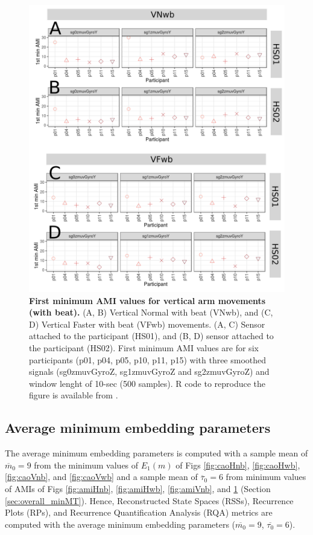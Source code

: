 \begin{figure}[!h]
\centering
\includegraphics[width=1.0\textwidth]{ami_Vwb_w10}
	\caption{
	{\bf First minimum AMI values for vertical arm movements (with beat).}
		(A, B) Vertical Normal with beat (VNwb), and 
		(C, D) Vertical Faster with beat (VFwb) movements.
		(A, C) Sensor attached to the participant (HS01), and
		(B, D) sensor attached to the participant (HS02).
		First minimum AMI values are for six participants 
		(p01, p04, p05, p10, p11, p15) with three smoothed 
		signals (sg0zmuvGyroZ, sg1zmuvGyroZ and sg2zmuvGyroZ) and 
		window lenght of 10-sec (500 samples).
		R code to reproduce the figure is available 
		from \cite{hwum2018}.
        }
    \label{fig:amiVwb}
\end{figure}



\subsection{Average minimum embedding parameters}
The average minimum embedding parameters is computed with 
a sample mean of $\overline{m}_0=9$ from the minimum values 
of $E_{1}(m)$ of Figs \ref{fig:caoHnb}, \ref{fig:caoHwb}, 
\ref{fig:caoVnb}, and \ref{fig:caoVwb} 
and a sample mean of $\overline{\tau}_0=6$ from minimum values of AMIs 
of Figs \ref{fig:amiHnb}, \ref{fig:amiHwb}, 
\ref{fig:amiVnb}, and \ref{fig:amiVwb} (Section \ref{sec:overall_minMT}).
Hence, Reconstructed State Spaces (RSSs), Recurrence Plots (RPs), and
Recurrence Quantification Analysis (RQA) metrics
are computed with the average minimum embedding parameters 
($\overline{m_0}=9$, $\overline{\tau_0}=6$).


